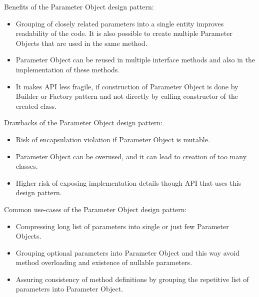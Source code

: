 Benefits of the Parameter Object design pattern:

\begin{itemize}
    \item Grouping of closely related parameters into a single entity improves readability of the code.
    It is also possible to create multiple Parameter Objects that are used in the same method.
    \item Parameter Object can be reused in multiple interface methods and also in the implementation of these methods.
    \item It makes API less fragile, if construction of Parameter Object is done by Builder or Factory pattern
    and not directly by calling constructor of the created class.
\end{itemize}

Drawbacks of the Parameter Object design pattern:

\begin{itemize}
    \item Risk of encapsulation violation if Parameter Object is mutable.
    \item Parameter Object can be overused, and it can lead to creation of too many classes.
    \item Higher risk of exposing implementation details though API that uses this design pattern.
\end{itemize}

Common use-cases of the Parameter Object design pattern:

\begin{itemize}
    \item Compressing long list of parameters into single or just few Parameter Objects.
    \item Grouping optional parameters into Parameter Object and this way avoid method overloading
    and existence of nullable parameters.
    \item Assuring consistency of method definitions by grouping the repetitive list of parameters
    into Parameter Object.
\end{itemize}
